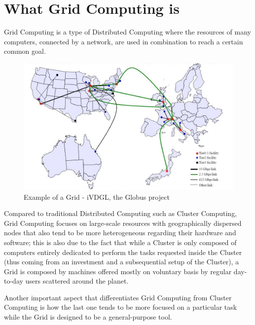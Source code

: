 \section{What Grid Computing is}
Grid Computing is a type of Distributed Computing where the resources of many computers, connected by a network, are used in combination to reach a certain common goal.

\begin{figure}[!ht]
    \centering
    \includegraphics[scale=0.46]{document/chapters/chapter_1/images/iVDGL_globus.jpg}
    \caption{Example of a Grid - iVDGL, the Globus project \cite{iVDGL}}
    \label{fig:iVDGL}
\end{figure}

Compared to traditional Distributed Computing such as Cluster Computing, Grid Computing focuses on large-scale resources with geographically dispersed nodes that also tend to be more heterogeneous regarding their hardware and software; this is also due to the fact that while a Cluster is only composed of computers entirely dedicated to perform the tasks requested inside the Cluster (thus coming from an investment and a subsequential setup of the Cluster), a Grid is composed by machines offered mostly on voluntary basis by regular day-to-day users scattered around the planet.

Another important aspect that differentiates Grid Computing from Cluster Computing is how the last one tends to be more focused on a particular task while the Grid is designed to be a general-purpose tool.

